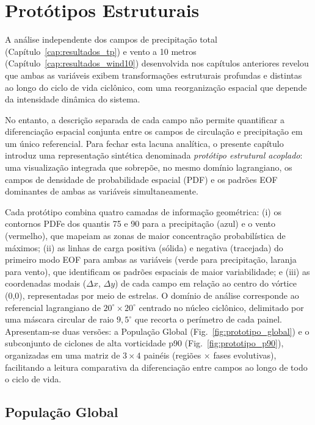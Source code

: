  \chapter{Protótipos Estruturais}\label{cap:prototipos}


A análise independente dos campos de precipitação total (Capítulo~\ref{cap:resultados_tp}) e vento a 10 metros (Capítulo~\ref{cap:resultados_wind10}) desenvolvida nos capítulos anteriores revelou que ambas as variáveis exibem transformações estruturais profundas e distintas ao longo do ciclo de vida ciclônico, com uma reorganização espacial que depende da intensidade dinâmica do sistema.

No entanto, a descrição separada de cada campo não permite quantificar a diferenciação espacial conjunta entre os campos de circulação e precipitação em um único referencial. Para fechar esta lacuna analítica, o presente capítulo introduz uma representação sintética denominada \textit{protótipo estrutural acoplado}: uma visualização integrada que sobrepõe, no mesmo domínio lagrangiano, os campos de densidade de probabilidade espacial (PDF) e os padrões EOF dominantes de ambas as variáveis simultaneamente.

Cada protótipo combina quatro camadas de informação geométrica: (i) os contornos PDFe dos quantis 75 e 90 para a precipitação (azul) e o vento (vermelho), que mapeiam as zonas de maior concentração probabilística de máximos; (ii) as linhas de carga positiva (sólida) e negativa (tracejada) do primeiro modo EOF para ambas as variáveis (verde para precipitação, laranja para vento), que identificam os padrões espaciais de maior variabilidade; e (iii) as coordenadas modais ($\Delta x$, $\Delta y$) de cada campo em relação ao centro do vórtice (0,0), representadas por meio de estrelas. O domínio de análise corresponde ao referencial lagrangiano de $20^{\circ} \times 20^{\circ}$ centrado no núcleo ciclônico, delimitado por uma máscara circular de raio $9{,}5^{\circ}$ que recorta o perímetro de cada painel. Apresentam-se duas versões: a População Global (Fig.~\ref{fig:prototipo_global}) e o subconjunto de ciclones de alta vorticidade p90 (Fig.~\ref{fig:prototipo_p90}), organizadas em uma matriz de $3 \times 4$ painéis (regiões $\times$ fases evolutivas), facilitando a leitura comparativa da diferenciação entre campos ao longo de todo o ciclo de vida.

\section{População Global}\label{sec:prototipo_global}


